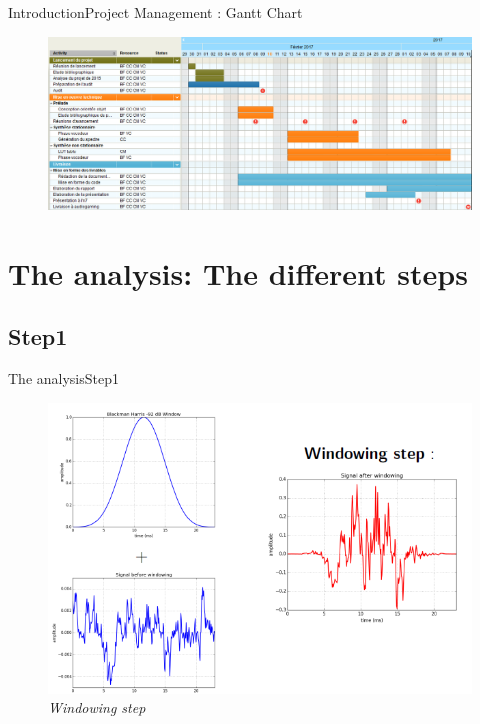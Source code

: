 \documentclass[10pt]{beamer}
\begin{document}
\begin{frame}{Introduction}{Project Management : Gantt Chart}

\begin{figure}
	\centerline{\includegraphics[scale=0.26]{Gantt.png}}
\end{figure}
\end{frame}

\section{The analysis: The different steps}
\subsection{Step1}
\begin{frame}{The analysis}{Step1}
\begin{figure}
	\centerline
	{\includegraphics[scale=0.4]{slide1.png}}
	\caption{\it Windowing step}
\end{figure}
\end{frame}
\end{document}
